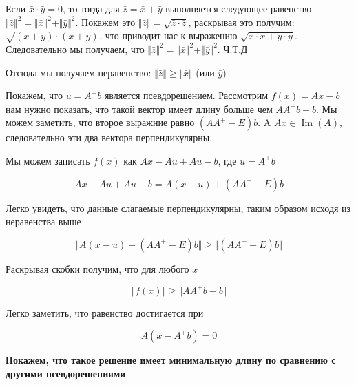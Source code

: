 \documentclass{article}
\begin{document}
    Если $\bar{x} \cdot \bar{y} = 0$, то тогда для $\bar{z} = \bar{x} + \bar{y}$
    выполняется следующее равенство $\Vert \bar{z} \Vert^{2} = \Vert \bar{x} \Vert^{2} + \Vert \bar{y} \Vert^{2}$.
    Покажем это $\Vert \bar{z} \Vert = \sqrt{\bar{z} \cdot \bar{z}}$, раскрывая это получим:
    $\sqrt{(\bar{x} + \bar{y}) \cdot (\bar{x} + \bar{y})}$, что приводит нас к выражению $\sqrt{ \bar{x} \cdot \bar{x} + \bar{y} \cdot \bar{y} }$.
    Следовательно мы получаем, что $\Vert \bar{z} \Vert^{2} = \Vert \bar{x} \Vert^{2} + \Vert \bar{y} \Vert^{2}$. Ч.Т.Д

    Отсюда мы получаем неравенство: $\Vert \bar{z} \Vert \geq \Vert \bar{x} \Vert$ (или $\bar{y}$)

    \quad 

    Покажем, что $u = A^{+} b$ является псевдорешением. Рассмотрим 
    $f(x) = Ax - b$ нам нужно показать, что такой вектор имеет длину больше 
    чем $AA^{+}b - b$. Мы можем заметить, что второе выражние равно 
    $(AA^{+} - E)b$. A $Ax \in \operatorname{Im}(A)$, следовательно 
    эти два вектора перпендикулярны.

    Мы можем записать $f(x)$ как $Ax - Au + Au - b$, 
    где $u = A^{+} b$

    \begin{equation}
        Ax - Au + Au - b = A(x - u) + (AA^{+} - E) b
    \end{equation}

    Легко увидеть, что данные слагаемые перпендикулярны, таким 
    образом исходя из неравенства выше 

    \begin{equation}
       \Vert A(x - u) + (AA^{+} - E) b \Vert \geq \Vert (AA^{+} - E) b \Vert
    \end{equation}

    Раскрывая скобки получим, что для любого $x$ 

    \begin{equation}
        \Vert f(x) \Vert \geq \Vert AA^{+}b - b \Vert
    \end{equation}

    Легко заметить, что равенство достигается при 

    \begin{equation}
        A(x - A^{+}b ) = 0
    \end{equation}

    \quad 

    \textbf{Покажем, что такое решение имеет минимальную длину по сравнению с другими 
    псевдорешениями} 
\end{document}

